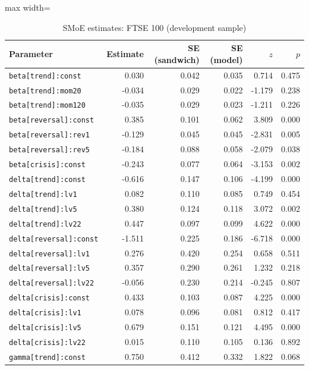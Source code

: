 \begin{table}[!htbp]\centering\scriptsize
\caption{SMoE estimates: FTSE 100 (development sample)}\label{tab:params_ftse}
\begin{adjustbox}{max width=\textwidth}
\begin{tabular}{lrrrrr}
\toprule
Parameter & Estimate & SE (sandwich) & SE (model) & $z$ & $p$\\
\midrule
\texttt{beta[trend]:const} & 0.030 & 0.042 & 0.035 & 0.714 & 0.475\\
\texttt{beta[trend]:mom20} & -0.034 & 0.029 & 0.022 & -1.179 & 0.238\\
\texttt{beta[trend]:mom120} & -0.035 & 0.029 & 0.023 & -1.211 & 0.226\\
\texttt{beta[reversal]:const} & 0.385 & 0.101 & 0.062 & 3.809 & 0.000\\
\texttt{beta[reversal]:rev1} & -0.129 & 0.045 & 0.045 & -2.831 & 0.005\\
\texttt{beta[reversal]:rev5} & -0.184 & 0.088 & 0.058 & -2.079 & 0.038\\
\texttt{beta[crisis]:const} & -0.243 & 0.077 & 0.064 & -3.153 & 0.002\\
\texttt{delta[trend]:const} & -0.616 & 0.147 & 0.106 & -4.199 & 0.000\\
\texttt{delta[trend]:lv1} & 0.082 & 0.110 & 0.085 & 0.749 & 0.454\\
\texttt{delta[trend]:lv5} & 0.380 & 0.124 & 0.118 & 3.072 & 0.002\\
\texttt{delta[trend]:lv22} & 0.447 & 0.097 & 0.099 & 4.622 & 0.000\\
\texttt{delta[reversal]:const} & -1.511 & 0.225 & 0.186 & -6.718 & 0.000\\
\texttt{delta[reversal]:lv1} & 0.276 & 0.420 & 0.254 & 0.658 & 0.511\\
\texttt{delta[reversal]:lv5} & 0.357 & 0.290 & 0.261 & 1.232 & 0.218\\
\texttt{delta[reversal]:lv22} & -0.056 & 0.230 & 0.214 & -0.245 & 0.807\\
\texttt{delta[crisis]:const} & 0.433 & 0.103 & 0.087 & 4.225 & 0.000\\
\texttt{delta[crisis]:lv1} & 0.078 & 0.096 & 0.081 & 0.812 & 0.417\\
\texttt{delta[crisis]:lv5} & 0.679 & 0.151 & 0.121 & 4.495 & 0.000\\
\texttt{delta[crisis]:lv22} & 0.015 & 0.110 & 0.105 & 0.136 & 0.892\\
\texttt{gamma[trend]:const} & 0.750 & 0.412 & 0.332 & 1.822 & 0.068\\

\end{tabular}
\end{adjustbox}
\end{table}
